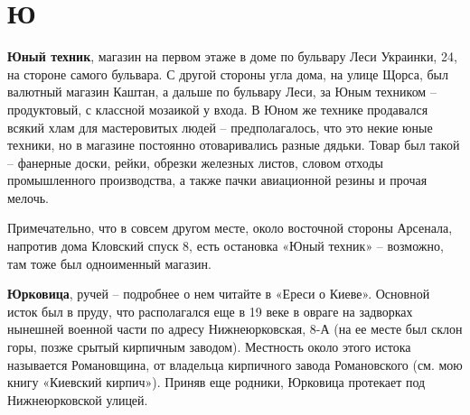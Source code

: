\chapter*{Ю}


\textbf{Юный техник}, магазин на первом этаже в доме по бульвару Леси Украинки, 24, на стороне самого бульвара. С другой стороны угла дома, на улице Щорса, был валютный магазин Каштан, а дальше по бульвару Леси, за Юным техником – продуктовый, с классной мозаикой у входа. В Юном же технике продавался всякий хлам для мастеровитых людей – предполагалось, что это некие юные техники, но в магазине постоянно отоваривались разные дядьки. Товар был такой – фанерные доски, рейки, обрезки железных листов, словом отходы промышленного производства, а также пачки авиационной резины и прочая мелочь.

Примечательно, что в совсем другом месте, около восточной стороны Арсенала, напротив дома Кловский спуск 8, есть остановка «Юный техник» – возможно, там тоже был одноименный магазин.\\

\medskip

\textbf{Юрковица}, ручей – подробнее о нем читайте в «Ереси о Киеве». Основной исток был в пруду, что располагался еще в 19 веке в овраге на задворках нынешней военной части по адресу Нижнеюрковская, 8-А (на ее месте был склон горы, позже срытый кирпичным заводом). Местность около этого истока называется Романовщина, от владельца кирпичного завода Романовского (см. мою книгу «Киевский кирпич»). Приняв еще родники, Юрковица протекает под Нижнеюрковской улицей.

